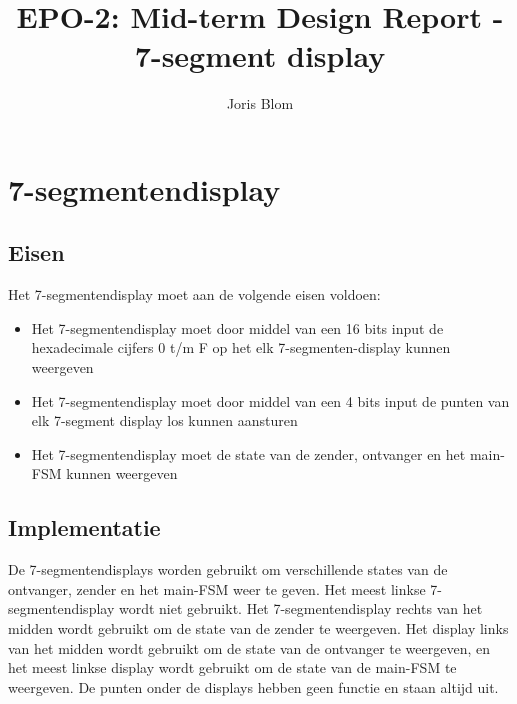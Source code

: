 \documentclass{report}
\title{EPO-2: Mid-term Design Report - 7-segment display}
\author{Joris Blom}
\begin{document}
\chapter{7-segmentendisplay}
\label{ch:sseg}
\section{Eisen}
\label{sec:Eisen}
Het 7-segmentendisplay moet aan de volgende eisen voldoen: 
\begin{itemize}
\item Het 7-segmentendisplay moet door middel van een 16 bits input de hexadecimale cijfers 0 t/m F op het elk 7-segmenten-display kunnen weergeven
\item Het 7-segmentendisplay moet door middel van een 4 bits input de punten van elk 7-segment display los kunnen aansturen
\item Het 7-segmentendisplay moet de state van de zender, ontvanger en het main-FSM kunnen weergeven
\end{itemize}

\section{Implementatie}
De 7-segmentendisplays worden gebruikt om verschillende states van de ontvanger, zender en het main-FSM weer te geven.
Het meest linkse 7-segmentendisplay wordt niet gebruikt.
Het 7-segmentendisplay rechts van het midden wordt gebruikt om de state van de zender te weergeven.
Het display links van het midden wordt gebruikt om de state van de ontvanger te weergeven, en het meest linkse display wordt gebruikt om de state van de main-FSM te weergeven.
De punten onder de displays hebben geen functie en staan altijd uit.
\end{document}
